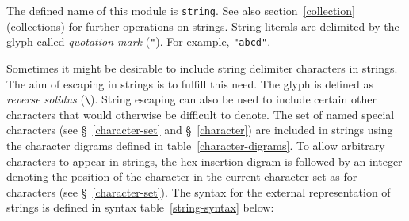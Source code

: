 \label{string}
\begin{optDefinition}
The defined name of this module is {\tt string}.  See also
section~\ref{collection} (collections) for further operations on
strings.
%
%
String literals are
delimited by the glyph called {\em quotation mark\/} (\verb+"+).  For
example, \verb+"abcd"+.

Sometimes it might be desirable to include string delimiter characters in
strings.  The aim of escaping in strings  is
to fulfill this need.  The 
 glyph is defined as {\em reverse
    solidus\/} (\verb+\+).  String escaping can also be used to include certain
other characters that would otherwise be difficult to denote.  The set of named
special characters (see \S~\ref{character-set} and \S~\ref{character}) are
included in strings using the character digrams defined in
table~\ref{character-digrams}.  To allow arbitrary characters to appear in
strings, the hex-insertion digram is followed by an integer denoting the
position of the character in the current character set as for characters (see
\S~\ref{character-set}).  The syntax for the external representation of strings
is defined in syntax table~\ref{string-syntax} below:
%
\Syntax
\label{string-syntax}
\end{optDefinition}
